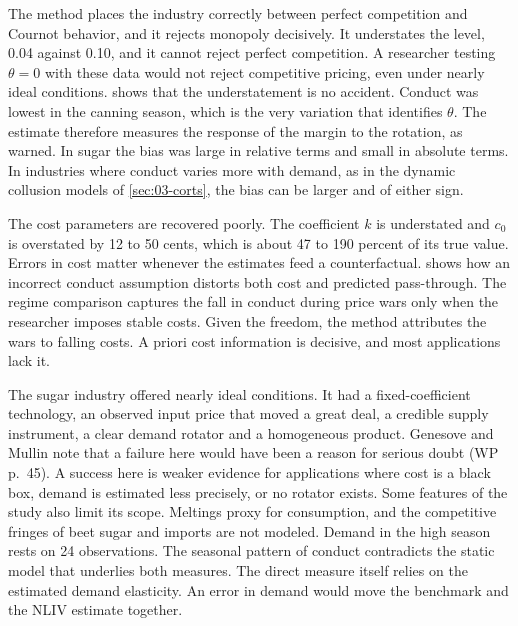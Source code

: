 The method places the industry correctly between perfect competition and Cournot behavior, and it rejects
monopoly decisively. It understates the level, 0.04 against 0.10, and it cannot reject perfect competition.
A researcher testing $\theta = 0$ with these data would not reject competitive pricing, even under nearly
ideal conditions.  shows that the understatement is no accident. Conduct was lowest in
the canning season, which is the very variation that identifies $\theta$. The estimate therefore measures
the response of the margin to the rotation, as \citet{Corts1999} warned. In sugar the bias was large in relative terms and small in absolute terms. In industries where conduct
varies more with demand, as in the dynamic collusion models of \cref{sec:03-corts}, the bias can be larger
and of either sign.

The cost parameters are recovered poorly. The coefficient $k$ is understated and $c_0$ is overstated by 12 to
50 cents, which is about 47 to 190 percent of its true value. Errors in cost matter whenever the estimates feed a
counterfactual.  shows how an incorrect conduct assumption distorts both cost and
predicted pass-through. The regime comparison captures the fall in conduct during price wars only when the
researcher imposes stable costs. Given the freedom, the method attributes the wars to falling costs. A
priori cost information is decisive, and most applications lack it.

The sugar industry offered nearly ideal conditions. It had a fixed-coefficient technology, an observed
input price that moved a great deal, a credible supply instrument, a clear demand rotator and a homogeneous
product.
Genesove and Mullin note that a failure here would have been a reason for serious doubt (WP p.~45). A
success here is weaker evidence for applications where cost is a black box, demand is estimated less
precisely, or no rotator exists. Some features of the study also limit its scope. Meltings proxy for
consumption, and the competitive fringes of beet sugar and imports are not modeled. Demand in the high season
rests on 24 observations. The seasonal pattern of conduct contradicts the static model that underlies both
measures. The direct measure itself relies on the estimated demand elasticity. An error in demand would move
the benchmark and the NLIV estimate together.

